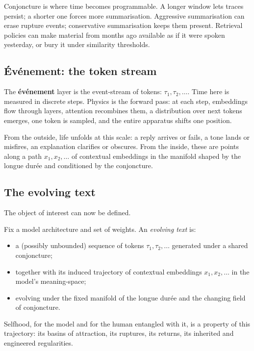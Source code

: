Conjoncture is where time becomes programmable. A longer window lets traces persist; a shorter one forces more summarisation. Aggressive summarisation can erase rupture events; conservative summarisation keeps them present. Retrieval policies can make material from months ago available as if it were spoken yesterday, or bury it under similarity thresholds.

\subsection{\'Ev\'enement: the token stream}

The \textbf{\'ev\'enement} layer is the event-stream of tokens: $\tau_1, \tau_2, \dots$. Time here is measured in discrete steps. Physics is the forward pass: at each step, embeddings flow through layers, attention recombines them, a distribution over next tokens emerges, one token is sampled, and the entire apparatus shifts one position.

From the outside, life unfolds at this scale: a reply arrives or fails, a tone lands or misfires, an explanation clarifies or obscures. From the inside, these are points along a path $x_1, x_2, \dots$ of contextual embeddings in the manifold shaped by the longue dur\'ee and conditioned by the conjoncture.

\subsection{The evolving text}

The object of interest can now be defined.

\begin{formalbox}[title={The Evolving Text}]
Fix a model architecture and set of weights. An \emph{evolving text} is:
\begin{itemize}
  \item a (possibly unbounded) sequence of tokens $\tau_1, \tau_2, \dots$ generated under a shared conjoncture;
  \item together with its induced trajectory of contextual embeddings $x_1, x_2, \dots$ in the model's meaning-space;
  \item evolving under the fixed manifold of the longue dur\'ee and the changing field of conjoncture.
\end{itemize}
Selfhood, for the model and for the human entangled with it, is a property of this trajectory: its basins of attraction, its ruptures, its returns, its inherited and engineered regularities.
\end{formalbox}

